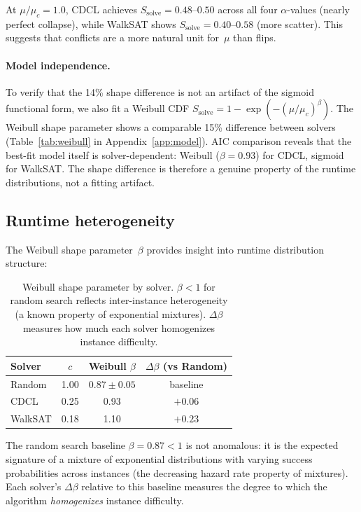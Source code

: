 \documentclass[11pt,a4paper]{article}
\newcommand{\mc}{\mu_c}
\newcommand{\Ssolve}{S_{\text{solve}}}
\begin{document}
At $\mu/\mc = 1.0$, CDCL achieves $\Ssolve = 0.48$--$0.50$
across all four $\alpha$-values (nearly perfect collapse),
while WalkSAT shows $\Ssolve = 0.40$--$0.58$ (more scatter).
This suggests that conflicts are a more natural unit for~$\mu$
than flips.

\paragraph{Model independence.}
To verify that the 14\% shape difference is not an artifact
of the sigmoid functional form, we also fit a Weibull CDF
$\Ssolve = 1 - \exp(-(\mu/\mc)^\beta)$.
The Weibull shape parameter shows a comparable 15\% difference
between solvers (Table~\ref{tab:weibull} in Appendix~\ref{app:model}).
AIC comparison reveals that the best-fit model itself is
solver-dependent: Weibull ($\beta = 0.93$) for CDCL,
sigmoid for WalkSAT.
The shape difference is therefore a genuine property of
the runtime distributions, not a fitting artifact.


\subsection{Runtime heterogeneity}
\label{sec:heterogeneity}

The Weibull shape parameter~$\beta$ provides insight into
runtime distribution structure:

\begin{table}[h]
\centering
\begin{tabular}{lccc}
\toprule
Solver & $c$ & Weibull $\beta$ & $\Delta\beta$ (vs Random) \\
\midrule
Random   & 1.00 & $0.87 \pm 0.05$ & baseline \\
CDCL     & 0.25 & 0.93 & $+0.06$ \\
WalkSAT  & 0.18 & 1.10 & $+0.23$ \\
\bottomrule
\end{tabular}
\caption{Weibull shape parameter by solver.
$\beta < 1$ for random search reflects inter-instance
heterogeneity (a known property of exponential mixtures).
$\Delta\beta$ measures how much each solver homogenizes
instance difficulty.}
\label{tab:beta}
\end{table}

The random search baseline $\beta = 0.87 < 1$ is not anomalous:
it is the expected signature of a mixture of exponential
distributions with varying success probabilities across instances
(the decreasing hazard rate property of mixtures).
Each solver's $\Delta\beta$ relative to this baseline
measures the degree to which the algorithm \emph{homogenizes}
instance difficulty.
\end{document}

